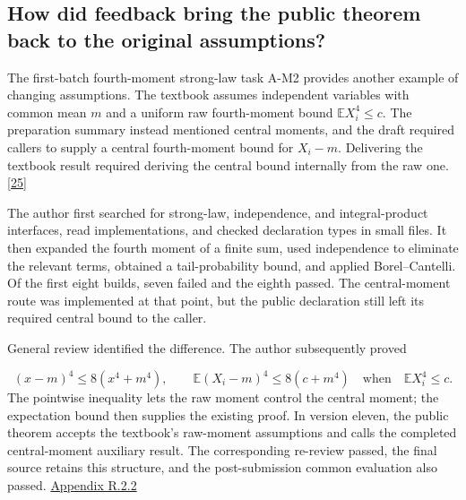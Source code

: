 \subsection[How did feedback bring the public theorem back to the original assumptions?]{\texorpdfstring{\protect\hypertarget{section-4-2}{}How did feedback bring the public theorem back to the original assumptions?}{How did feedback bring the public theorem back to the original assumptions?}}
The first-batch fourth-moment strong-law task A-M2 provides another example of changing assumptions. The textbook assumes independent variables with common mean $m$ and a uniform raw fourth-moment bound $\mathbb E X_i^4\le c$. The preparation summary instead mentioned central moments, and the draft required callers to supply a central fourth-moment bound for $X_i-m$. Delivering the textbook result required deriving the central bound internally from the raw one. \hyperlink{ref-25}{\mbox{[25]}}

The author first searched for strong-law, independence, and integral-product interfaces, read implementations, and checked declaration types in small files. It then expanded the fourth moment of a finite sum, used independence to eliminate the relevant terms, obtained a tail-probability bound, and applied Borel–Cantelli. Of the first eight builds, seven failed and the eighth passed. The central-moment route was implemented at that point, but the public declaration still left its required central bound to the caller.

General review identified the difference. The author subsequently proved

\[
(x-m)^4\leq8(x^4+m^4),\qquad
\mathbb E(X_i-m)^4\leq8(c+m^4)
\quad\text{when}\quad\mathbb E X_i^4\leq c.
\]
The pointwise inequality lets the raw moment control the central moment; the expectation bound then supplies the existing proof. In version eleven, the public theorem accepts the textbook's raw-moment assumptions and calls the completed central-moment auxiliary result. The corresponding re-review passed, the final source retains this structure, and the post-submission common evaluation also passed. \href{en-appendix.pdf\#r2-2}{Appendix R.2.2}

